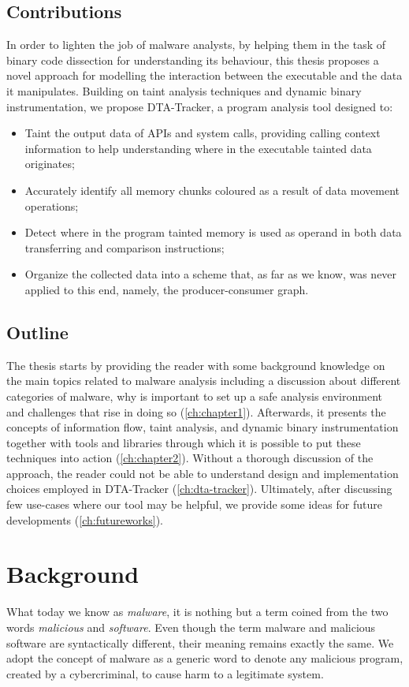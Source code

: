 \documentclass[LaM,binding=0.6cm]{sapthesis}
\begin{document}
\section*{Contributions}
In order to lighten the job of malware analysts, by helping them in the task of binary code dissection for understanding its behaviour, this thesis proposes a novel approach for modelling the interaction between the executable and the data it manipulates. Building on taint analysis techniques and dynamic binary instrumentation, we propose {\sf DTA-Tracker}, a program analysis tool designed to:
\begin{itemize}
\item Taint the output data of APIs and system calls, providing calling context information to help understanding where in the executable tainted data originates;
\item Accurately identify all memory chunks coloured as a result of data movement operations;
\item Detect where in the program tainted memory is used as operand in both data transferring and comparison instructions;
\item Organize the collected data into a scheme that, as far as we know, was never applied to this end, namely, the producer-consumer graph.
\end{itemize}  

\section*{Outline}
The thesis starts by providing the reader with some background knowledge on the main topics related to malware analysis including a discussion about different categories of malware, why is important to set up a safe analysis environment and challenges that rise in doing so (\autoref{ch:chapter1}). Afterwards, it presents the concepts of information flow, taint analysis, and dynamic binary instrumentation together with tools and libraries through which it is possible to put these techniques into action (\autoref{ch:chapter2}). Without a thorough discussion of the approach, the reader could not be able to understand design and implementation choices employed in {\sf DTA-Tracker} (\autoref{ch:dta-tracker}). Ultimately, after discussing few use-cases where our tool may be helpful, we provide some ideas for future developments (\autoref{ch:futureworks}).

\chapter{Background}
\label{ch:chapter1}
What today we know as \textit{malware}, it is nothing but a term coined from the two words \textit{malicious} and \textit{software}. Even though the term malware and malicious software are syntactically different, their meaning remains exactly the same. We adopt the concept of malware as a generic word to denote any malicious program, created by a cybercriminal, to cause harm to a legitimate system.\\
\end{document}
